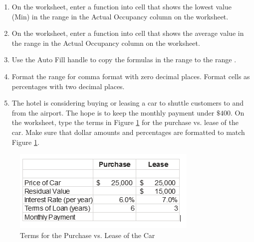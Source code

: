 \begin{enumerate}
	\item On the  worksheet, enter a function into cell  that shows the lowest value (Min) in the range  in the Actual Occupancy column on the  worksheet.
	
	\item On the  worksheet, enter a function into cell  that shows the average value in the range  in the Actual Occupancy column on the  worksheet.
	
	\item Use the Auto Fill handle to copy the formulas in the range  to the range .
	
	\item Format the range  for comma format with zero decimal places. Format cells  as percentages with two decimal places.
	
	\item The hotel is considering buying or leasing a car to shuttle customers to and from the airport. The hope is to keep the monthly payment under $ \$400 $. On the  worksheet, type the terms in Figure \ref{02:fig50} for the purchase vs. lease of the car. Make sure that dollar amounts and percentages are formatted to match Figure \ref{02:fig50}.
	\end{enumerate}

\begin{figure}[H]
	\centering
	\includegraphics[width=\maxwidth{.95\linewidth}]{gfx/ch02_fig50}
	\caption{Terms for the Purchase vs. Lease of the Car}
	\label{02:fig50}
\end{figure}

